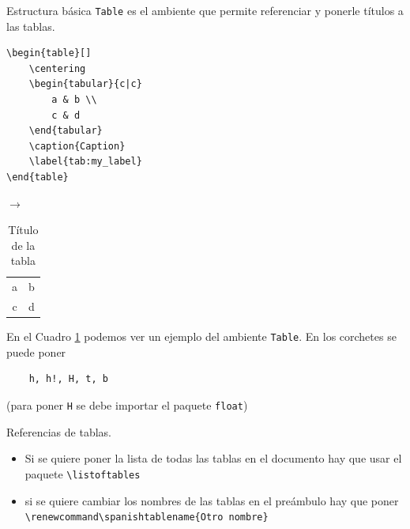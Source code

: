 \documentclass[dvipsnames,xcolor, handout]{beamer}
\theoremstyle{plain}
\theoremstyle{definition}
\begin{document}
\begin{frame}[fragile]{Estructura básica}
\verb!Table! es el ambiente que permite referenciar y ponerle títulos a las tablas. 

\begin{minipage}{0.57\linewidth}
\begin{verbatim}
\begin{table}[]
    \centering
    \begin{tabular}{c|c}
        a & b \\
        c & d
    \end{tabular}
    \caption{Caption}
    \label{tab:my_label}
\end{table}
\end{verbatim}
\end{minipage}
\begin{minipage}{0.1\linewidth}
    $\rightarrow$
\end{minipage}
\begin{minipage}{0.3\linewidth}
    \begin{table}[]
    \centering
    \begin{tabular}{c|c}
        a & b \\
        c & d
    \end{tabular}
    \caption{Título de la tabla}
    \label{tab:my_label}
\end{table}
\end{minipage}
\begin{small}

    En el Cuadro \ref{tab:my_label} podemos ver un ejemplo del ambiente \verb!Table!. 
    En los corchetes se puede poner \vspace*{-0.5cm} \begin{verbatim}
    h, h!, H, t, b
\end{verbatim}
    \vspace*{-0.5cm}(para poner \verb!H! se debe importar el paquete \verb!float!)
\end{small}
\end{frame}

\begin{frame}[fragile]{Referencias de tablas.}
\begin{itemize}
    \item Si se quiere poner la lista de todas las tablas en el documento hay que usar el paquete \verb!\listoftables!
    \item si se quiere cambiar los nombres de las tablas en el preámbulo hay que poner \verb!\renewcommand\spanishtablename{Otro nombre}!
\end{itemize}
\end{frame}
\end{document}
